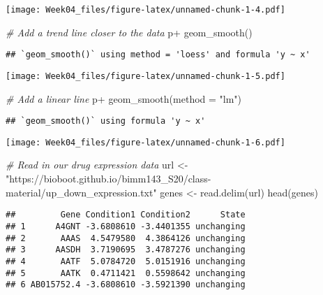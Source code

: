 \documentclass[
]{article}
\newenvironment{Shaded}{\begin{snugshade}}{\end{snugshade}}
\newcommand{\AttributeTok}[1]{\textcolor[rgb]{0.77,0.63,0.00}{#1}}
\newcommand{\CommentTok}[1]{\textcolor[rgb]{0.56,0.35,0.01}{\textit{#1}}}
\newcommand{\FunctionTok}[1]{\textcolor[rgb]{0.00,0.00,0.00}{#1}}
\newcommand{\NormalTok}[1]{#1}
\newcommand{\OtherTok}[1]{\textcolor[rgb]{0.56,0.35,0.01}{#1}}
\newcommand{\SpecialCharTok}[1]{\textcolor[rgb]{0.00,0.00,0.00}{#1}}
\newcommand{\StringTok}[1]{\textcolor[rgb]{0.31,0.60,0.02}{#1}}
\begin{document}
\texttt{[image: Week04\_files/figure-latex/unnamed-chunk-1-4.pdf]}

\begin{Shaded}
\begin{Highlighting}[]
\CommentTok{\# Add a trend line closer to the data }
\NormalTok{p}\SpecialCharTok{+} \FunctionTok{geom\_smooth}\NormalTok{()}
\end{Highlighting}
\end{Shaded}

\begin{verbatim}
## `geom_smooth()` using method = 'loess' and formula 'y ~ x'
\end{verbatim}

\texttt{[image: Week04\_files/figure-latex/unnamed-chunk-1-5.pdf]}

\begin{Shaded}
\begin{Highlighting}[]
\CommentTok{\# Add a linear line}
\NormalTok{p}\SpecialCharTok{+} \FunctionTok{geom\_smooth}\NormalTok{(}\AttributeTok{method =} \StringTok{"lm"}\NormalTok{)}
\end{Highlighting}
\end{Shaded}

\begin{verbatim}
## `geom_smooth()` using formula 'y ~ x'
\end{verbatim}

\texttt{[image: Week04\_files/figure-latex/unnamed-chunk-1-6.pdf]}

\begin{Shaded}
\begin{Highlighting}[]
\CommentTok{\# Read in our drug expression data}
\NormalTok{url }\OtherTok{\textless{}{-}} 
  \StringTok{"https://bioboot.github.io/bimm143\_S20/class{-}material/up\_down\_expression.txt"}
\NormalTok{genes }\OtherTok{\textless{}{-}} \FunctionTok{read.delim}\NormalTok{(url)}
\FunctionTok{head}\NormalTok{(genes)}
\end{Highlighting}
\end{Shaded}

\begin{verbatim}
##         Gene Condition1 Condition2      State
## 1      A4GNT -3.6808610 -3.4401355 unchanging
## 2       AAAS  4.5479580  4.3864126 unchanging
## 3      AASDH  3.7190695  3.4787276 unchanging
## 4       AATF  5.0784720  5.0151916 unchanging
## 5       AATK  0.4711421  0.5598642 unchanging
## 6 AB015752.4 -3.6808610 -3.5921390 unchanging
\end{verbatim}
\end{document}
